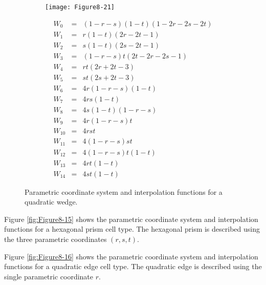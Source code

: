 \begin{description}[leftmargin=0cm,labelindent=0cm]
    \begin{figure}[!htb]
        \centering
        \begin{subfigure}{0.48\linewidth}
            \centering
            \texttt{[image: Figure8-21]}
            \caption*{}
        \end{subfigure}
        \hfill
        \begin{subfigure}{0.48\linewidth}
            \centering
            \begin{equation*}
            \begin{array}{lll}
            W_0 &=& (1 - r - s)(1 - t)(1 - 2r -2s -2t) \\
            W_1 &=& r(1 - t)(2r - 2t - 1) \\
            W_2 &=& s(1 - t)(2s - 2t - 1) \\
            W_3 &=& (1 - r - s)t(2t - 2r - 2s - 1) \\
            W_4 &=& rt(2r + 2t - 3) \\
            W_5 &=& st(2s + 2t - 3) \\
            W_6 &=& 4r(1 - r - s)(1 - t) \\
            W_7 &=& 4rs(1 - t) \\
            W_8 &=& 4s(1 - t)(1 - r - s) \\
            W_9 &=& 4r(1 - r - s)t \\
            W_{10} &=& 4 rst \\
            W_{11} &=& 4 (1 - r - s)s t\\
            W_{12} &=& 4 (1 - r - s)t(1 - t) \\
            W_{13} &=& 4rt(1 - t) \\
            W_{14} &=& 4st(1 - t)
            \end{array}
            \end{equation*}
        \end{subfigure}%
        \caption{Parametric coordinate system and interpolation functions for a quadratic wedge.}
        \label{fig:Figure8-21}
    \end{figure}

    \item[Hexagonal Prism.\index{interpolation function!hexagonal prism}] Figure \ref{fig:Figure8-15} shows the parametric coordinate system and interpolation functions for a hexagonal prism cell type. The hexagonal prism is described using the three parametric coordinates $(r,s,t)$.

    \item[Quadratic Edge.\index{interpolation function!quadratic edge}] Figure \ref{fig:Figure8-16} shows the parametric coordinate system and interpolation functions for a quadratic edge cell type. The quadratic edge is described using the single parametric coordinate $r$.


\end{description}
